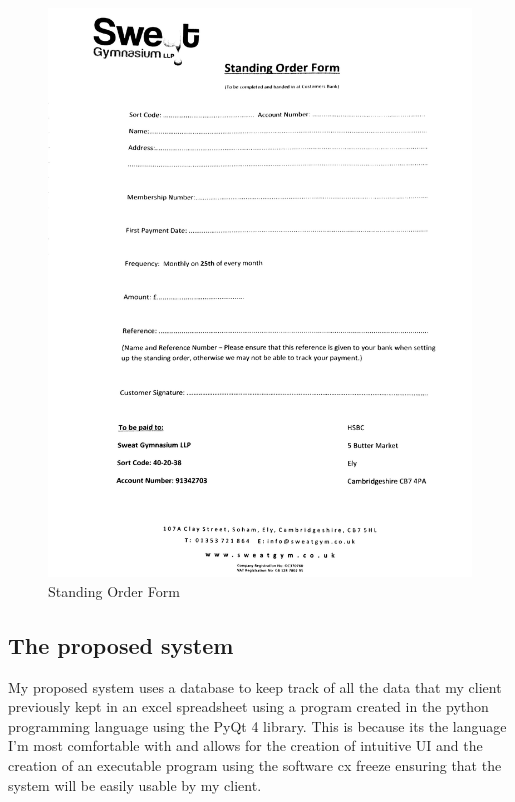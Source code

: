 \begin{figure}[H]
    \includegraphics[width=\textwidth]{StandingOrderForm,jpeg.jpg}
    \caption{Standing Order Form} \label{fig:Standing Order Form }
\end{figure}

\subsection{The proposed system}

My proposed system uses a database to keep track of all the data that my client previously kept in an excel spreadsheet using a program created in the python programming language using the PyQt 4 library. This is because its the language I'm most comfortable with and allows for the creation of intuitive UI and the creation of an executable program using the software cx freeze ensuring that the system will be easily usable by my client.

